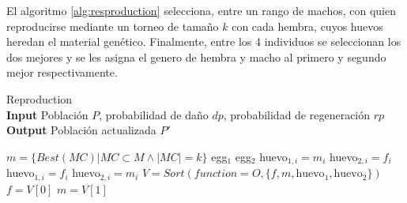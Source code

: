  El algoritmo \ref{alg:resproduction} selecciona, entre un rango de machos, con quien reproducirse mediante un torneo de tamaño $k$ con cada hembra, cuyos huevos heredan el material genético. Finalmente, entre los 4 individuos se seleccionan los dos mejores y se les asigna el genero de hembra y macho al primero y segundo mejor respectivamente.
 
   \begin{algorithm}[H]
 	\caption{Reproduction \\
 		\textbf{Input} Población $P$, probabilidad de daño $dp$, probabilidad de regeneración $rp$ \\
 		\textbf{Output}  Población actualizada $P'$} 
 	\begin{algorithmic}[1]
 			\State $m = \{Best(MC) | MC \subset M \land |MC| = k\}$
 			\State egg$_1$
 			\State egg$_2$
 					\State huevo$_{1,i} = m_i$
 					\State huevo$_{2,i} = f_i$ 
 				\Else
 					\State huevo$_{1,i} = f_i$
 					\State huevo$_{2,i} = m_i$ 
 				\EndIf
 			\EndFor
 		\EndFor
 		\State $V=Sort(function= O, \{ f, m, \text{huevo}_1, \text{huevo}_2 \})$
 		\State $f = V[0]$
 		\State $m = V[1]$
 	\end{algorithmic}
 	\label{alg:resproduction}
 \end{algorithm}

 
 